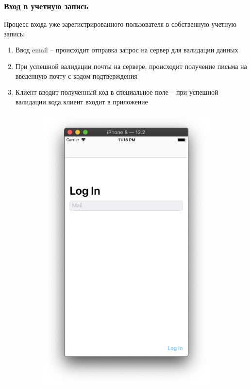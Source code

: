 \documentclass[a4paper,12pt]{article}
\begin{document}
	\subsubsection{Вход в учетную запись}
	Процесс входа уже зарегистрированного пользователя в собственную учетную запись:
	\begin{enumerate}
		\item Ввод email -- происходит отправка запрос на сервер для валидации данных
		\item При успешной валидации почты на сервере, происходит получение письма на введенную почту с кодом подтверждения 
		\item Клиент вводит полученный код в специальное поле -- при успешной валидации кода клиент входит в приложение
	\end{enumerate}
	\begin{figure}[h!]
		\centering
		\begin{subfigure}[b]{0.3\linewidth}
			\includegraphics[width=\linewidth]{../includes/pmi/login.png}

\end{subfigure}
\end{figure}
\end{document}
